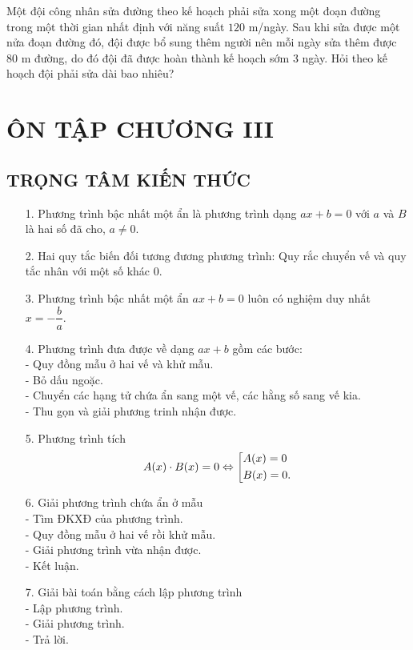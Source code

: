 \begin{bt}%
Một đội công nhân sửa đường theo kế hoạch phải sửa xong một đoạn đường trong một thời gian nhất định với năng suất $120$ m/ngày. Sau khi sửa được một nửa đoạn đường đó, đội được bổ sung thêm người nên mỗi ngày sửa thêm được $80$ m đường, do đó đội đã được hoàn thành kế hoạch sớm $3$ ngày. Hỏi theo kế hoạch đội phải sửa dài bao nhiêu?
\end{bt}

\section{ÔN TẬP CHƯƠNG III}
\subsection{TRỌNG TÂM KIẾN THỨC}
\begin{enumerate}
\item[1.] Phương trình bậc nhất một ẩn là phương trình dạng $ax+b=0$ với $a$ và $B$ là hai số đã cho, $a\ne 0$.
\item[2.] Hai quy tắc biến đối tương đương phương trình: Quy rắc chuyển vế và quy tắc nhân với một số khác $0$.
\item[3.] Phương trình bậc nhất một ẩn $ax+b=0$ luôn có nghiệm duy nhất $x=-\dfrac{b}{a}$.
\item[4.] Phương trình đưa được về dạng $ax+b$ gồm các bước: \\
- Quy đồng mẫu ở hai vế và khử mẫu. \\
- Bỏ dấu ngoặc. \\
- Chuyển các hạng tử chứa ẩn sang một vế, các hằng số sang vế kia. \\
- Thu gọn và giải phương trinh nhận được. 
\item[5.] Phương trình tích 
\[A(x)\cdot B(x) =0 \Leftrightarrow \left[\begin{aligned}&A(x)=0\\&B(x)=0.\end{aligned}\right.\]
\item[6.] Giải phương trình chứa ẩn ở mẫu\\
- Tìm ĐKXĐ của phương trình. \\
- Quy đồng mẫu ở hai vế rồi khử mẫu. \\
- Giải phương trình vừa nhận được. \\
- Kết luận.
\item[7.] Giải bài toán bằng cách lập phương trình \\
- Lập phương trình. \\
- Giải phương trình. \\
- Trả lời. 
\end{enumerate}
